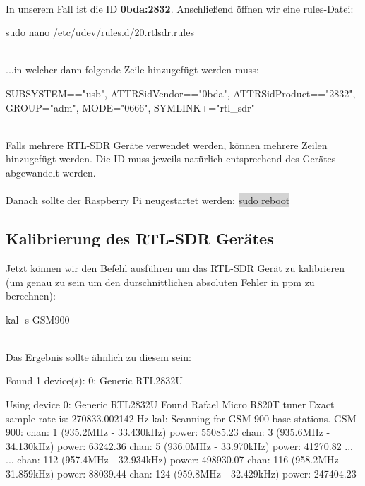 \noindent{}\\In unserem Fall ist die ID \textbf{0bda:2832}. Anschließend öffnen wir eine rules-Datei:

\begin{code}
sudo nano /etc/udev/rules.d/20.rtlsdr.rules
\end{code}

\noindent\\...in welcher dann folgende Zeile hinzugefügt werden muss:

\begin{code}
SUBSYSTEM=="usb", ATTRS{idVendor}=="0bda", ATTRS{idProduct}=="2832", GROUP="adm", MODE="0666", SYMLINK+="rtl_sdr"
\end{code}

\noindent\\Falls mehrere RTL-SDR Geräte verwendet werden, können mehrere Zeilen hinzugefügt werden. Die ID muss jeweils natürlich entsprechend des Gerätes abgewandelt werden.\\
\\Danach sollte der Raspberry Pi neugestartet werden: \colorbox{lightgray}{sudo reboot}

\subsection{Kalibrierung des RTL-SDR Gerätes} \label{Kal}
Jetzt können wir den Befehl ausführen um das RTL-SDR Gerät zu kalibrieren (um genau zu sein um den durschnittlichen absoluten Fehler in ppm zu berechnen):

%
%

\begin{code}
kal -s GSM900 
\end{code}

\noindent\\Das Ergebnis sollte ähnlich zu diesem sein:

\begin{code}
Found 1 device(s):
  0:  Generic RTL2832U

Using device 0: Generic RTL2832U
Found Rafael Micro R820T tuner
Exact sample rate is: 270833.002142 Hz
kal: Scanning for GSM-900 base stations.
GSM-900:
	chan: 1 (935.2MHz - 33.430kHz)	power: 55085.23
	chan: 3 (935.6MHz - 34.130kHz)	power: 63242.36
	chan: 5 (936.0MHz - 33.970kHz)	power: 41270.82
...
...
	chan: 112 (957.4MHz - 32.934kHz)	power: 498930.07
	chan: 116 (958.2MHz - 31.859kHz)	power: 88039.44
	chan: 124 (959.8MHz - 32.429kHz)	power: 247404.23
\end{code}

